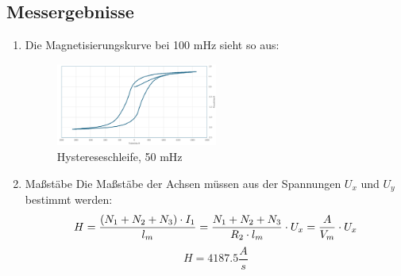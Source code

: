 \documentclass[a4paper,twoside,12pt,DIV=13,BCOR=5mm,numbers=noenddot,cleardoublepage=empty]{scrbook}
\begin{document}
    \newpage

    \subsection{Messergebnisse}

        \begin{enumerate}
            \item Die Magnetisierungskurve bei 100 mHz sieht so aus:

            \begin{figure}[h] 
            \centering
            \includegraphics[width=0.5\textwidth]{pictures/50mHz.png} 
            \caption{Hystereseschleife, 50 mHz}
            \label{fig:meinbild}
             \end{figure}
            \item Maßstäbe
                Die Maßstäbe der Achsen müssen aus der Spannungen $U_x$ und $U_y$ bestimmt werden:
                \begin{equation}
                    H = \frac{(N_1 + N_2 + N_3) \cdot I_1}{l_m} \\
                    = \frac{N_1 + N_2 + N_3}{R_2 \cdot l_m} \cdot U_x \\
                    = \frac{A}{V_m} \cdot U_x
                \end{equation}
                \begin{equation}
                    H = 4187.5 \frac{A}{s}
                \end{equation}


\end{enumerate}
\end{document}
